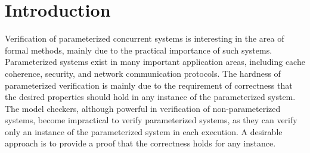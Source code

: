 \documentclass[final]{IEEEtran}
\begin{document}
\section{Introduction }
Verification of parameterized concurrent systems is interesting in
the area of formal methods, mainly due to the practical importance
of such systems. Parameterized systems exist in many important
application areas, including cache coherence, security, and
network communication protocols. %
The hardness of parameterized verification is mainly due to the requirement of correctness that
the desired properties should hold in any instance of the parameterized
system. The model checkers, although powerful in verification of
non-parameterized systems, become impractical to verify parameterized systems, as they can verify only an instance of the parameterized
system in each execution.
A desirable approach is to provide a proof that the correctness holds for any instance.
\end{document}

